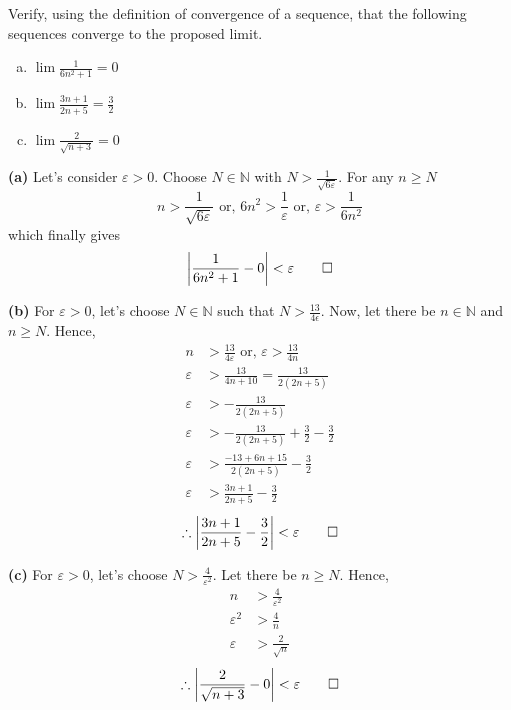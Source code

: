 \begin{example}{Verify, using the definition of convergence of a sequence, that the following sequences converge to the proposed limit.
    \begin{enumerate}[(a)]
        \item $\lim \frac{1}{6n^2+1}=0$ 
        \item $\lim \frac{3n+1}{2n+5}=\frac{3}{2}$
        \item $\lim \frac{2}{\sqrt{n+3}}=0$
    \end{enumerate}}
    
    \textbf{(a)} Let's consider $\varepsilon>0$. Choose $N\in\mathbb{N}$ with $N>\frac{1}{\sqrt{6\varepsilon}}$. For any $n \ge N$ \[
        n>\frac{1}{\sqrt{6\varepsilon}} \text{ or, } 6n^2>\frac{1}{\varepsilon} \text{ or, } \varepsilon>\frac{1}{6n^2}
    \] which finally gives \[ \left| \frac{1}{6n^2+1}-0 \right| <\varepsilon \qed \] 

    \textbf{(b)} For $\varepsilon>0$, let's choose $N \in \mathbb{N}$ such that $N>\frac{13}{4\epsilon}$. Now, let there be $n\in \mathbb{N}$ and $n \ge N$. Hence,
    \begin{align*}
        n &> \frac{13}{4\varepsilon} \text{ or, } \varepsilon>\frac{13}{4n} \\
        \varepsilon &> \frac{13}{4n+10} = \frac{13}{2(2n+5)} \\
        \varepsilon &> -\frac{13}{2(2n+5)} \\
        \varepsilon &> -\frac{13}{2(2n+5)}+\frac{3}{2}-\frac{3}{2} \\
        \varepsilon &> \frac{-13+6n+15}{2(2n+5)} - \frac{3}{2} \\
        \varepsilon &> \frac{3n+1}{2n+5} - \frac{3}{2}
    \end{align*}
    \[ \therefore \left| \frac{3n+1}{2n+5} - \frac{3}{2} \right| < \varepsilon \qed \] 

    \textbf{(c)} For $\varepsilon>0$, let's choose $N>\frac{4}{\varepsilon^2}$. Let there be $n \ge N$. Hence,
    \begin{align*}
        n &> \frac{4}{\varepsilon^2} \\
        \varepsilon^2 &> \frac{4}{n} \\
        \varepsilon &> \frac{2}{\sqrt{n}}
    \end{align*} \[  
       \therefore \left| \frac{2}{\sqrt{n+3}} - 0 \right| < \varepsilon \qed
    \] 
\end{example}

